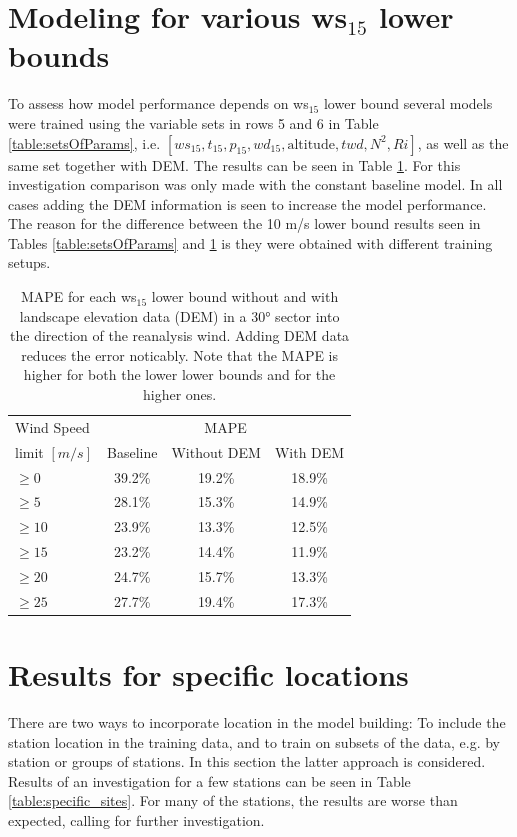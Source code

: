 \section{Modeling for various ws$_{15}$ lower bounds}
To assess how model performance depends on ws$_{15}$ lower bound several models were trained using the variable sets in rows 5 and 6 in Table \ref{table:setsOfParams}, i.e. $[ws_{15}, t_{15}, p_{15}, wd_{15}, \text{altitude}, twd, N^2, Ri]$, as well as the same set together with DEM. The results can be seen in Table \ref{table:results}. For this investigation comparison was only made with the constant baseline model. In all cases adding the DEM information is seen to increase the model performance. The reason for the difference between the 10 m/s lower bound results seen in Tables \ref{table:setsOfParams} and \ref{table:results} is they were obtained with different training setups. 

\begin{table}[h]
  \caption[Model results for different wind speed limits]{MAPE for each ws$_{15}$ lower bound without and with landscape elevation data (DEM) in a 30° sector into the direction of the reanalysis wind. Adding DEM data reduces the error noticably. Note that the MAPE is higher for both the lower lower bounds and for the higher ones.}
    \label{table:results}
    \centering
    \begin{tabular}{lccc}
        \toprule
        Wind Speed & \multicolumn{3}{c}{MAPE} \\
        limit $[m/s]$ & Baseline & Without DEM & With DEM \\
        \midrule
        $\geq 0$ & 39.2\% & 19.2\% & 18.9\% \\
        $\geq 5$ & 28.1\% & 15.3\% & 14.9\%\\
        $\geq 10$ & 23.9\% & 13.3\% & 12.5\%\\
        $\geq 15$ & 23.2\% & 14.4\% & 11.9\%\\
        $\geq 20$ & 24.7\% & 15.7\% & 13.3\%\\
        $\geq 25$ & 27.7\% & 19.4\% & 17.3\%\\
        \bottomrule
    \end{tabular}
  \end{table}

\section{Results for specific locations}
There are two ways to incorporate location in the model building: To include the station location in the training data, and to train on subsets of the data, e.g. by station or groups of stations. In this section the latter approach is considered. Results of an investigation for a few stations can be seen in Table \ref{table:specific_sites}. For many of the stations, the results are worse than expected, calling for further investigation.

